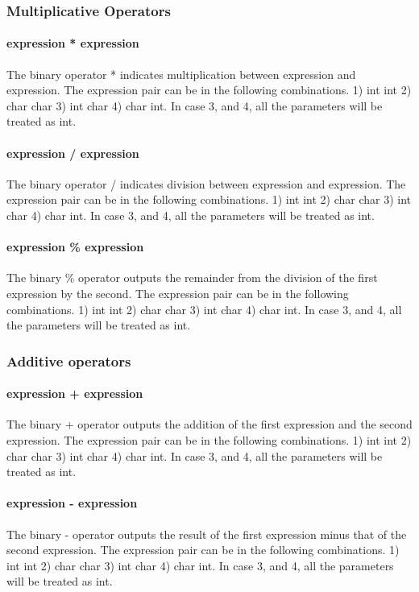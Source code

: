 \documentclass[a4paper,12pt]{article}
\begin{document}
\subsubsection{Multiplicative Operators}
\paragraph{expression * expression}
The binary operator * indicates multiplication between expression and expression. The expression pair can be in the following combinations. 1) int int 2) char char 3) int char 4) char int. In case 3, and 4, all the parameters will be treated as int.
\paragraph{expression / expression}
The binary operator / indicates division between expression and expression. The expression pair can be in the following combinations. 1) int int 2) char char 3) int char 4) char int. In case 3, and 4, all the parameters will be treated as int.
\paragraph{expression \% expression}
The binary \% operator outputs the remainder from the division of the first expression by the second. The expression pair can be in the following combinations. 1) int int 2) char char 3) int char 4) char int. In case 3, and 4, all the parameters will be treated as int.
\subsubsection{Additive operators}
\paragraph{expression + expression}
The binary + operator outputs the addition of the first expression and the second expression. The expression pair can be in the following combinations. 1) int int 2) char char 3) int char 4) char int. In case 3, and 4, all the parameters will be treated as int.
\paragraph{expression - expression}
The binary - operator outputs the result of the first expression minus that of the second expression. The expression pair can be in the following combinations. 1) int int 2) char char 3) int char 4) char int. In case 3, and 4, all the parameters will be treated as int.
\end{document}
